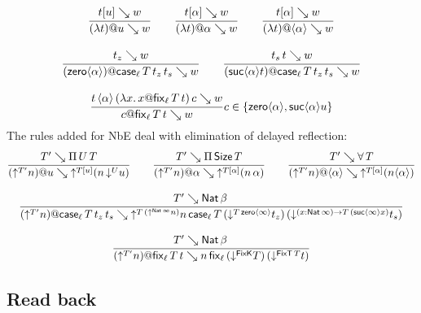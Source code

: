\documentclass[acmlarge,review,anonymous]{acmart}\settopmatter{printfolios=true}
\begin{document}
\begin{gather*}
  \ru{t[u] \evalsto w
    }{(\lambda t) @ u \evalsto w}
\qquad
  \ru{t[\alpha] \evalsto w
    }{(\lambda t) @ \alpha \evalsto w}
\qquad
  \ru{t[\alpha] \evalsto w
    }{(\lambda t) @ \ann \alpha \evalsto w}
\\[2ex]
  \ru{t_z \evalsto w
    }{(\zero \alpha) @ \casett \evalsto w}
\qquad
  \ru{t_s\, t \evalsto w
    }{(\suc \alpha t) @ \casett \evalsto w}
\\[2ex]
  \ru{t\,\ann \alpha\,(\lambda x.\, x@ \fixtt)\,c \evalsto w
     }{c @ \fixtt \evalsto w
     }{c\in \{ \zero \alpha, \suc \alpha u \}}
\end{gather*}
The rules added for NbE deal with elimination of delayed reflection:
\begin{gather*}
  \ru{T' \evalsto \piT U T
    }{(\up {T'} n) @ u \evalsto \up{T[u]} (n \, \down U u) }
\qquad
  \ru{T' \evalsto \piT \Size T
    }{(\up {T'} n) @ \alpha \evalsto \up{T[\alpha]} (n \, \alpha)}
\qquad
  \ru{T' \evalsto \forallT T
    }{(\up {T'} n) @ \ann \alpha \evalsto \up{T[\alpha]} (n \ann \alpha)}
\\[2ex]
  \ru{T' \evalsto \Nat \beta \qquad
    }{(\up {T'} n) @ \case[\ell] T {t_z} {t_s} \evalsto
      \up{T\,(\up{\Nat \infty} n)}
         n\,\case[\ell]
             T %
             {(\down {T\,{\zero\infty}} t_z)}
             {(\down {\funS x {\Nat \infty} T\,(\suc \infty x)} t_s)}
    }
\\[2ex]
  \ru{T' \evalsto \Nat \beta \qquad
    }{(\up {T'} n) @ \fix[\ell] T t \evalsto
      n\,\fix[\ell] {(\down {\FixK} T)} {(\down {\FixT\, T} t)}
    }
\end{gather*}

\subsection{Read back}
\label{sec:read}
\end{document}
